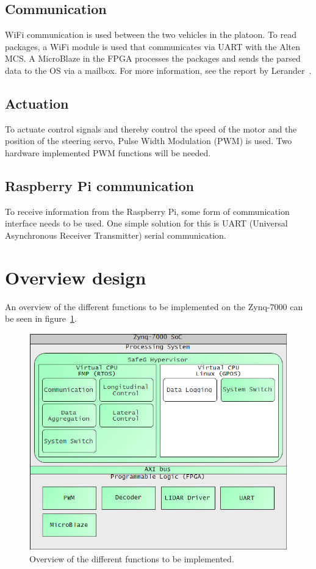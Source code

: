 \subsection{Communication}
WiFi communication is used between the two vehicles in the platoon. To read packages, a WiFi module is used that communicates via UART with the Alten MCS. A MicroBlaze in the FPGA processes the packages and sends the parsed data to the OS via a mailbox. For more information, see the report by Lerander~\cite{lerander2017}.

\subsection{Actuation}
To actuate control signals and thereby control the speed of the motor and the position of the steering servo, Pulse Width Modulation (PWM) is used. Two hardware implemented PWM functions will be needed.

\subsection{Raspberry Pi communication}
To receive information from the Raspberry Pi, some form of communication interface needs to be used. One simple solution for this is UART (Universal Asynchronous Receiver Transmitter) serial communication. 

\section{Overview design}
An overview of the different functions to be implemented on the Zynq-7000 can be seen in figure~\ref{fig:overview}.

\begin{figure}[H]
\centering
\includegraphics[width=\textwidth]{./img/design_overview.png}
\caption{Overview of the different functions to be implemented.}\label{fig:overview}
\end{figure}

